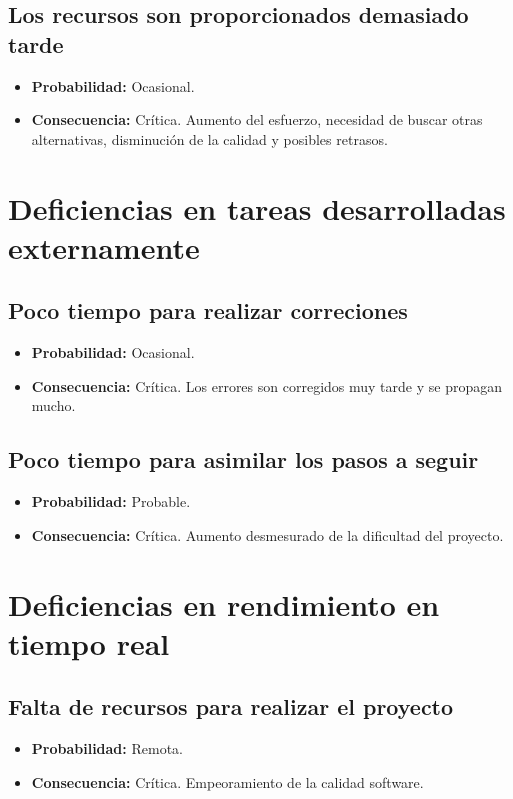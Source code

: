 \documentclass[spanish,a4paper,12pt]{report}	%
\begin{document}
\subsection*{Los recursos son proporcionados demasiado tarde}	
	\begin{itemize}
		\item \textbf {Probabilidad: }Ocasional.
		\item \textbf {Consecuencia: }Crítica. Aumento del esfuerzo, necesidad de buscar otras alternativas, disminución de la calidad y posibles retrasos.
	\end{itemize}

%
\section{Deficiencias en tareas desarrolladas externamente}

\subsection*{Poco tiempo para realizar correciones}	
	\begin{itemize}
		\item \textbf {Probabilidad: }Ocasional.
		\item \textbf {Consecuencia: }Crítica. Los errores son corregidos muy tarde y se propagan mucho.
	\end{itemize}

\subsection*{Poco tiempo para asimilar los pasos a seguir}	
	\begin{itemize}
		\item \textbf {Probabilidad: }Probable.
		\item \textbf {Consecuencia: }Crítica. Aumento desmesurado de la dificultad del proyecto.
	\end{itemize}

%
\section{Deficiencias en rendimiento en tiempo real}

\subsection*{Falta de recursos para realizar el proyecto}	
	\begin{itemize}
		\item \textbf {Probabilidad: }Remota.
		\item \textbf {Consecuencia: }Crítica. Empeoramiento de la calidad software.
	\end{itemize}
\end{document}
